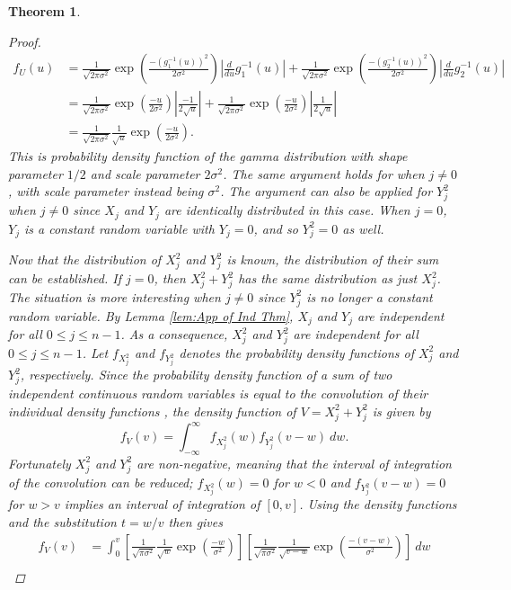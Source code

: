 \documentclass[12pt]{book}
\newcommand{\noiseSD}{\sigma}	%
\newtheorem{theorem}{Theorem}[section]
\begin{document}
\begin{theorem}
\begin{proof}
\begin{align*}
f_U(u) &= \frac{1}{\sqrt{2\pi\noiseSD^2}}\exp\left(\frac{-(g_1^{-1}(u))^2}{2\noiseSD^2}\right)\left|\frac{d}{du}g_1^{-1}(u)\right| + \frac{1}{\sqrt{2\pi\noiseSD^2}}\exp\left(\frac{-(g_2^{-1}(u))^2}{2\noiseSD^2}\right)\left|\frac{d}{du}g_2^{-1}(u)\right| \\
&= \frac{1}{\sqrt{2\pi\noiseSD^2}}\exp\left(\frac{-u}{2\noiseSD^2}\right)\left|\frac{-1}{2\sqrt{u}}\right| + \frac{1}{\sqrt{2\pi\noiseSD^2}}\exp\left(\frac{-u}{2\noiseSD^2}\right)\left|\frac{1}{2\sqrt{u}}\right| \\
&= \frac{1}{\sqrt{2\pi\noiseSD^2}} \frac{1}{\sqrt{u}} \exp\left(\frac{-u}{2\noiseSD^2}\right).
\end{align*}
This is probability density function of the gamma distribution with shape parameter $1/2$ and scale parameter $2\noiseSD^2$. The same argument holds for when $j \neq 0$, with scale parameter instead being $\noiseSD^2$. The argument can also be applied for $Y_j^2$ when $j \neq 0$ since $X_j$ and $Y_j$ are identically distributed in this case. When $j = 0$, $Y_j$ is a constant random variable with $Y_j = 0$, and so $Y_j^2 = 0$ as well. \par 
Now that the distribution of $X_j^2$ and $Y_j^2$ is known, the distribution of their sum can be established. If $j = 0$, then $X_j^2 + Y_j^2$ has the same distribution as just $X_j^2$. The situation is more interesting when $j \neq 0$ since $Y_j^2$ is no longer a constant random variable. By Lemma \ref{lem:App of Ind Thm}, $X_j$ and $Y_j$ are independent for all $0 \leq j \leq n-1$. As a consequence, $X_j^2$ and $Y_j^2$ are independent for all $0 \leq j \leq n-1$. Let $f_{X_j^2}$ and $f_{Y_j^2}$ denotes the probability density functions of $X_j^2$ and $Y_j^2$, respectively. Since the probability density function of a sum of two independent continuous random variables is equal to the convolution of their individual density functions \cite[p.~215]{CasellaBerger02}, the density function of $V = X_j^2 + Y_j^2$ is given by 
\[f_V(v) = \int_{-\infty}^{\infty} f_{X_j^2}(w)f_{Y_j^2}(v-w) \: dw.\]
Fortunately $X_j^2$ and $Y_j^2$ are non-negative, meaning that the interval of integration of the convolution can be reduced; $f_{X_j^2}(w) = 0$ for $w < 0$ and $f_{Y_j^2}(v-w) = 0$ for $w > v$ implies an interval of integration of $[0,v]$. Using the density functions and the substitution $t = w/v$ then gives
\begin{align*}
f_V(v) &= \int_0^v \left[\frac{1}{\sqrt{\pi\noiseSD^2}} \frac{1}{\sqrt{w}} \exp\left(\frac{-w}{\noiseSD^2}\right)\right]\left[\frac{1}{\sqrt{\pi\noiseSD^2}} \frac{1}{\sqrt{v-w}} \exp\left(\frac{-(v-w)}{\noiseSD^2}\right)\right] \: dw \\

\end{align*}
\end{proof}
\end{theorem}
\end{document}

